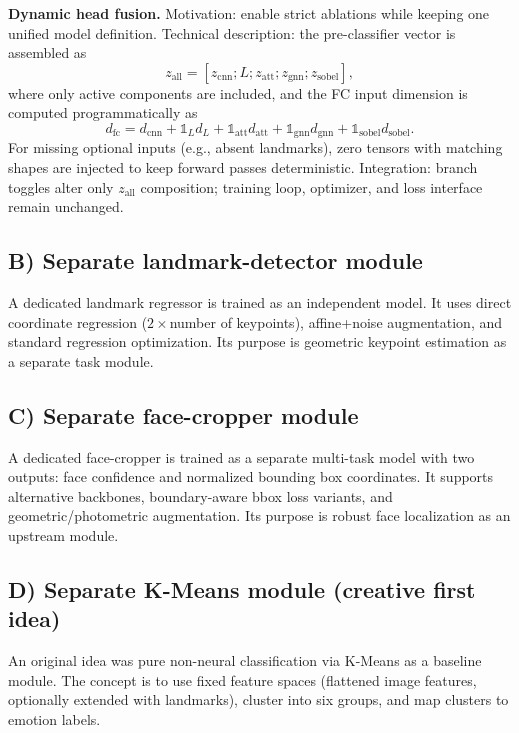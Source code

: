 \textbf{Dynamic head fusion.}
Motivation: enable strict ablations while keeping one unified model definition.
Technical description: the pre-classifier vector is assembled as
\[
z_{\text{all}}=[z_{\text{cnn}};L;z_{\text{att}};z_{\text{gnn}};z_{\text{sobel}}],
\]
where only active components are included, and the FC input dimension is computed programmatically as
\[
d_{\text{fc}}=d_{\text{cnn}}+\mathbb{1}_{L}d_L+\mathbb{1}_{\text{att}}d_{\text{att}}+\mathbb{1}_{\text{gnn}}d_{\text{gnn}}+\mathbb{1}_{\text{sobel}}d_{\text{sobel}}.
\]
For missing optional inputs (e.g., absent landmarks), zero tensors with matching shapes are injected to keep forward passes deterministic.
Integration: branch toggles alter only \(z_{\text{all}}\) composition; training loop, optimizer, and loss interface remain unchanged.

\subsection{B) Separate landmark-detector module}

A dedicated landmark regressor is trained as an independent model.
It uses direct coordinate regression ($2\times$number of keypoints), affine+noise augmentation, and standard regression optimization.
Its purpose is geometric keypoint estimation as a separate task module.

\subsection{C) Separate face-cropper module}

A dedicated face-cropper is trained as a separate multi-task model with two outputs: face confidence and normalized bounding box coordinates.
It supports alternative backbones, boundary-aware bbox loss variants, and geometric/photometric augmentation.
Its purpose is robust face localization as an upstream module.

\subsection{D) Separate K-Means module (creative first idea)}

An original idea was pure non-neural classification via K-Means as a baseline module.
The concept is to use fixed feature spaces (flattened image features, optionally extended with landmarks), cluster into six groups, and map clusters to emotion labels.
